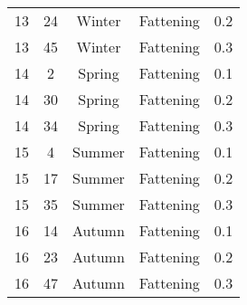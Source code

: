 \begin{table}[]
\begin{tabular}{ccccc}
13                  & 24     & Winter & Fattening & 0.2    \\
13                  & 45     & Winter & Fattening & 0.3    \\
14                  & 2      & Spring & Fattening & 0.1    \\
14                  & 30     & Spring & Fattening & 0.2    \\
14                  & 34     & Spring & Fattening & 0.3    \\
15                  & 4      & Summer & Fattening & 0.1    \\
15                  & 17     & Summer & Fattening & 0.2    \\
15                  & 35     & Summer & Fattening & 0.3    \\
16                  & 14     & Autumn & Fattening & 0.1    \\
16                  & 23     & Autumn & Fattening & 0.2    \\
16                  & 47     & Autumn & Fattening & 0.3   
\end{tabular}
\end{table}